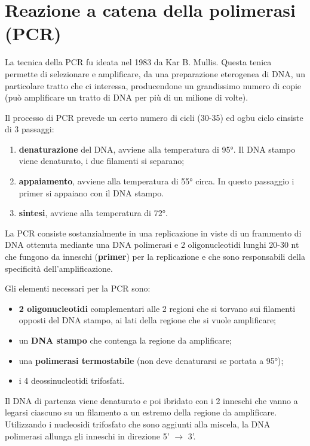 \documentclass[]{article}
\date{}
\begin{document}
\section{Reazione a catena della polimerasi
(PCR)}\label{reazione-a-catena-della-polimerasi-pcr}

La tecnica della PCR fu ideata nel 1983 da Kar B. Mullis. Questa tenica
permette di selezionare e amplificare, da una preparazione eterogenea di
DNA, un particolare tratto che ci interessa, producendone un grandissimo
numero di copie (può amplificare un tratto di DNA per più di un milione
di volte).

Il processo di PCR prevede un certo numero di cicli (30-35) ed ogbu
ciclo cinsiste di 3 passaggi:

\begin{enumerate}
\def\labelenumi{\arabic{enumi}.}
\itemsep1pt\parskip0pt
\item
  \textbf{denaturazione} del DNA, avviene alla temperatura di 95°. Il
  DNA stampo viene denaturato, i due filamenti si separano;
\item
  \textbf{appaiamento}, avviene alla temperatura di 55° circa. In questo
  passaggio i primer si appaiano con il DNA stampo.
\item
  \textbf{sintesi}, avviene alla temperatura di 72°.
\end{enumerate}

La PCR consiste sostanzialmente in una replicazione in viste di un
frammento di DNA ottenuta mediante una DNA polimerasi e 2
oligonucleotidi lunghi 20-30 nt che fungono da inneschi
(\textbf{primer}) per la replicazione e che sono responsabili della
specificità dell'amplificazione.

Gli elementi necessari per la PCR sono:

\begin{itemize}
\itemsep1pt\parskip0pt
\item
  \textbf{2 oligonucleotidi} complementari alle 2 regioni che si torvano
  sui filamenti opposti del DNA stampo, ai lati della regione che si
  vuole amplificare;
\item
  un \textbf{DNA stampo} che contenga la regione da amplificare;
\item
  una \textbf{polimerasi termostabile} (non deve denaturarsi se portata
  a 95°);
\item
  i 4 deossinucleotidi trifosfati.
\end{itemize}

Il DNA di partenza viene denaturato e poi ibridato con i 2 inneschi che
vanno a legarsi ciascuno su un filamento a un estremo della regione da
amplificare. Utilizzando i nucleosidi trifosfato che sono aggiunti alla
miscela, la DNA polimerasi allunga gli inneschi in direzione 5'
\(\rightarrow\) 3'.
\end{document}
